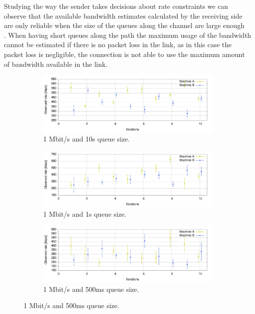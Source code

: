 Studying the way the sender takes decisions about rate constraints we can observe that the available bandwidth estimates calculated by the receiving side are only reliable when the size of the queues along the channel are large enough~\cite{alvestrandCongestion2012} . When having short queues along the path the maximum usage of the bandwidth cannot be estimated if there is no packet loss in the link, as in this case the packet loss is negligible, the connection is not able to use the maximum amount of bandwidth available in the link.

\begin{figure}[htp]
        \centering
        \begin{subfigure}[b]{1\textwidth}
                \centering
                \includegraphics[width=\textwidth]{./figures/1mb_10s_mean_deviation_bw.pdf}
      \caption[1 Mbit/s and 10s queue size]{1 Mbit/s and 10s queue size.}
	\label{fig:1mb_10s_mean_deviation_bw}
        \end{subfigure}
        \qquad

        \begin{subfigure}[b]{1\textwidth}
                \centering
                \includegraphics[width=\textwidth]{./figures/1mb_1s_mean_deviation_bw.pdf}
      \caption[1 Mbit/s and 1s queue size]{1 Mbit/s and 1s queue size.}
	\label{fig:1mb_1s_mean_deviation_bw}
        \end{subfigure}
        
        \begin{subfigure}[b]{1\textwidth}
                \centering
                \includegraphics[width=\textwidth]{./figures/1mb_05s_mean_deviation_bw.pdf}
      \caption[1 Mbit/s and 500ms queue size]{1 Mbit/s and 500ms queue size.}
	\label{fig:1mb_500ms_mean_deviation_bw}
        \end{subfigure}
        \qquad


\end{figure}
